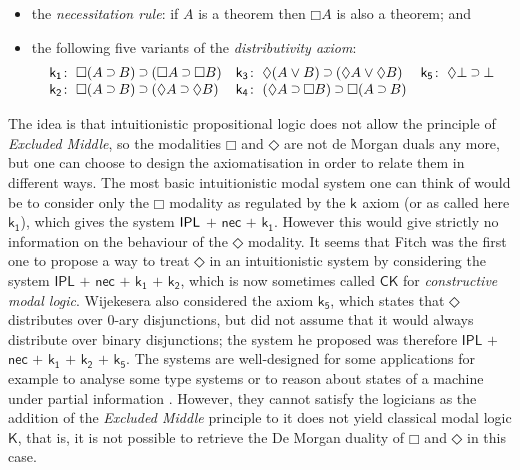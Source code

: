 \documentclass[a4paper]{article}
\theoremstyle{plain}
\theoremstyle{definition}
\newcommand*{\ax}[1]{\mathsf{#1}}
\newcommand*{\kax}[1][]		{\ax{k_{#1}}}
\newcommand*{\IK}{\mathsf{IK}}
\newcommand*{\K}{\mathsf{K}}
\newcommand*{\OR}{\mathbin{\vee}}
\newcommand*{\BOT}{\mathord{\bot}}
\newcommand*{\IMP}{\mathbin{\scalebox{.9}{\raise.2ex\hbox{$\supset$}}}}
\newcommand*{\BOX}{\mathord{\Box}}
\newcommand*{\DIA}{\mathord{\Diamond}}
\newcommand*{\rn}[1]  {\ensuremath{\mathsf{#1}}}
\begin{document}
\begin{itemize}
	\item the \emph{necessitation rule}: if $A$ is a theorem then $\BOX A$ is also a theorem; and
	\item the following five variants of the \emph{distributivity axiom}:
	\begin{equation*}
	\label{eq:ik}%
	\begin{array}[t]{r@{\;}l@{\quad}r@{\;}l@{\quad}r@{\;}l}
	\kax[1]\colon&\BOX(A\IMP B)\IMP(\BOX A\IMP\BOX B)
	&
	\kax[3]\colon&\DIA(A\OR B)\IMP(\DIA A\OR\DIA B)
	&
	\kax[5]\colon&\DIA\BOT\IMP\BOT
	\\
	\kax[2]\colon&\BOX(A\IMP B)\IMP(\DIA A\IMP\DIA B)
	&
	\kax[4]\colon&(\DIA A\IMP \BOX B)\IMP\BOX(A\IMP B)\\%
	\end{array}
	\end{equation*}
\end{itemize}

The idea is that intuitionistic propositional logic does not allow the principle of \emph{Excluded Middle}, so the modalities $\BOX$ and $\DIA$ are not de Morgan duals any more, but one can choose to design the axiomatisation in order to relate them in different ways. The most basic intuitionistic modal system one can think of would be to consider only the $\BOX$ modality as regulated by the $\kax$ axiom (or as called here $\kax[1]$), which gives the system $\break \rn{IPL}$ $\rn{+}$ $\rn{nec}$ $\rn{+}$ $\kax[1]$. However this would give strictly no information on the behaviour of the $\DIA$ modality.
It seems that Fitch \cite{fitch:pm48} was the first one to propose a way to treat $\DIA$ in an intuitionistic system by considering the system  $\rn{IPL}$ $\rn{+}$ $\rn{nec}$ $\rn{+}$ $\kax[1]$ $\rn{+}$ $\kax[2]$, which is now sometimes called $\rn{CK}$ for \emph{constructive modal logic}. Wijekesera \cite{wijesekera:apal90} also considered the axiom $\kax[5]$, which states that $\DIA$ distributes over 0-ary disjunctions, but did not assume that it would always distribute over binary disjunctions; the system he proposed was therefore  $\rn{IPL}$ $\rn{+}$ $\rn{nec}$ $\rn{+}$ $\kax[1]$ $\rn{+}$ $\kax[2]$  $\rn{+}$ $\kax[5]$. The systems are well-designed for some applications for example to analyse some type systems \cite{benton:etal:jfp98} or to reason about states of a machine under partial information \cite{wijesekera:nerode:apal05}. However, they cannot satisfy the logicians as the addition of the \emph{Excluded Middle} principle to it does not yield classical modal logic $\K$, that is, it is not possible to retrieve the De Morgan duality of $\BOX$ and $\DIA$ in this case.
\end{document}

